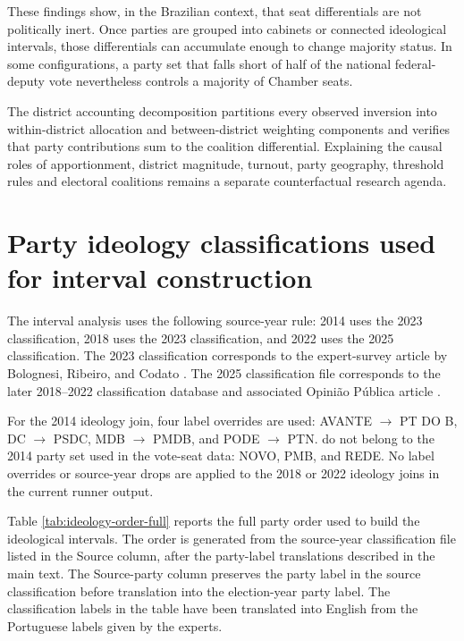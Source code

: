 \documentclass[11pt]{article}
\begin{document}
These findings show, in the Brazilian context, that seat differentials are not politically
inert. Once parties are grouped into cabinets or connected ideological
intervals, those differentials can accumulate enough to change majority status.
In some configurations, a party set that falls short of half of the national
federal-deputy vote nevertheless controls a majority of Chamber seats.

The district accounting decomposition partitions every observed inversion into
within-district allocation and between-district weighting components and verifies
that party contributions sum to the coalition differential. Explaining the
causal roles of apportionment, district magnitude, turnout, party geography,
threshold rules and electoral coalitions remains a separate
counterfactual research agenda.


\printbibliography


\appendix


\section{Party ideology classifications used for interval construction}\label{app:ideology-order}

The interval analysis uses the following source-year rule: 2014 uses the 2023
classification, 2018 uses the 2023 classification, and 2022 uses the 2025
classification. The 2023 classification corresponds to the expert-survey article
by Bolognesi, Ribeiro, and Codato \parencite{bolognesi2023nova}. The 2025
classification file corresponds to the later 2018--2022 classification database
and associated Opinião Pública article \parencite{bolognesi2025dataverse,bolognesi2026desaparecimento}.

For the 2014 ideology join, four label overrides are used: AVANTE $\rightarrow$
PT DO B, DC $\rightarrow$ PSDC, MDB $\rightarrow$ PMDB, and PODE $\rightarrow$
PTN. do not belong to the 2014 party set used in the vote-seat data: NOVO,
PMB, and REDE. No label overrides or source-year drops are applied to the 2018
or 2022 ideology joins in the current runner output.

Table \ref{tab:ideology-order-full} reports the full party order used to build
the ideological intervals. The order is generated from the source-year
classification file listed in the Source column, after the party-label
translations described in the main text. The Source-party column preserves the
party label in the source classification before translation into the
election-year party label. The classification labels in the table have been translated into English
from the Portuguese labels given by the experts.
\end{document}
